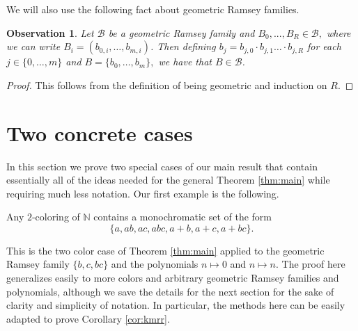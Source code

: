 \documentclass[tocmacros]{daj}
\newtheorem{observation}[theorem]{Observation}
\begin{document}
We will also use the following fact about geometric Ramsey families.

\begin{observation}\label{obs tech}
    Let $\mathcal{B}$ be a geometric Ramsey family and $B_0,...,B_R\in\mathcal{B},$ where we can write $B_i=(b_{0,i},\ldots,b_{m,i})$.  Then defining $b_j=b_{j,0}\cdot b_{j,1}\ldots\cdot b_{j,R}$ for each $j\in \{0,\ldots,m\}$ and $B=\{b_0,\ldots,b_m\},$ we have that $B\in \mathcal{B}$.
\end{observation}

\begin{proof}
    This follows from the definition of being geometric and induction on $R.$ 
    \end{proof}

\section{Two concrete cases}\label{concrete}

In this section we prove two special cases of our main result that contain essentially all of the ideas needed for the general Theorem \ref{thm:main} while requiring much less notation.  Our first example is the following.

\begin{proposition}\label{geom2}
Any $2$-coloring of $\mathbb{N}$ contains a monochromatic set of the form $$\{a,ab,ac,abc, a+b,a+c,a+bc\}.$$
\end{proposition}

This is the two color case of Theorem \ref{thm:main} applied to the geometric Ramsey family $\{b,c,bc\}$ and the polynomials $n\mapsto 0$ and $n\mapsto n$.  The proof here generalizes easily to more colors and arbitrary geometric Ramsey families and polynomials, although we save the details for the next section for the sake of clarity and simplicity of notation.  In particular, the methods here can be easily adapted to prove Corollary \ref{cor:kmrr}.
\end{document}
